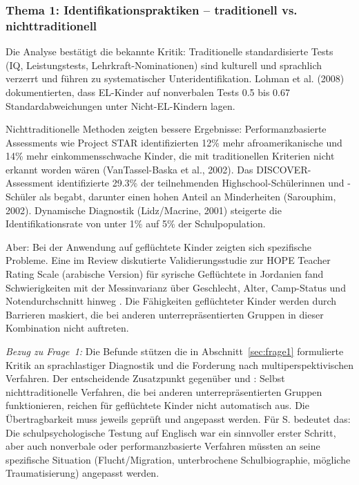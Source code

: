 \documentclass[ngerman, a4paper]{article}
\begin{document}
\subsubsection*{Thema 1: Identifikationspraktiken -- traditionell vs.
  nichttraditionell}

Die Analyse bestätigt die bekannte Kritik: Traditionelle standardisierte
Tests (IQ, Leistungstests, Lehrkraft-Nominationen) sind kulturell und
sprachlich verzerrt und führen zu systematischer Unteridentifikation.
Lohman et al. (2008) dokumentierten, dass EL-Kinder auf nonverbalen Tests
0.5 bis 0.67 Standardabweichungen unter Nicht-EL-Kindern lagen.

Nichttraditionelle Methoden zeigten bessere Ergebnisse: Performanzbasierte
Assessments wie Project STAR identifizierten 12\% mehr afroamerikanische
und 14\% mehr einkommensschwache Kinder, die mit traditionellen Kriterien
nicht erkannt worden wären (VanTassel-Baska et al., 2002). Das
DISCOVER-Assessment identifizierte 29.3\% der teilnehmenden
Highschool-Schülerinnen und -Schüler als begabt, darunter einen hohen
Anteil an Minderheiten (Sarouphim, 2002). Dynamische Diagnostik
(Lidz/Macrine, 2001) steigerte die Identifikationsrate von unter 1\% auf
5\% der Schulpopulation.

Aber: Bei der Anwendung auf geflüchtete Kinder zeigten sich spezifische
Probleme. Eine im Review diskutierte Validierungsstudie zur HOPE Teacher
Rating Scale (arabische Version) für syrische Geflüchtete in Jordanien
fand Schwierigkeiten mit der Messinvarianz über Geschlecht, Alter,
Camp-Status und Notendurchschnitt hinweg \parencite[S.\,10]{alodat2025equitable}.
Die Fähigkeiten geflüchteter Kinder werden durch Barrieren maskiert, die
bei anderen unterrepräsentierten Gruppen in dieser Kombination nicht
auftreten.

\textit{Bezug zu Frage~1:} Die Befunde stützen die in
Abschnitt~\ref{sec:frage1} formulierte Kritik an sprachlastiger Diagnostik
und die Forderung nach multiperspektivischen Verfahren. Der entscheidende
Zusatzpunkt gegenüber \textcite{mun2020identifying} und
\textcite{gubbins2020promising}: Selbst nichttraditionelle Verfahren, die
bei anderen unterrepräsentierten Gruppen funktionieren, reichen für
geflüchtete Kinder nicht automatisch aus. Die Übertragbarkeit muss jeweils
geprüft und angepasst werden. Für S. bedeutet das: Die schulpsychologische
Testung auf Englisch war ein sinnvoller erster Schritt, aber auch
nonverbale oder performanzbasierte Verfahren müssten an seine spezifische
Situation (Flucht/Migration, unterbrochene Schulbiographie, mögliche
Traumatisierung) angepasst werden.
\end{document}
